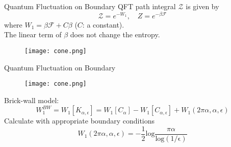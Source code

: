 \documentclass{beamer}
\begin{document}
\begin{frame}{Quantum Fluctuation on Boundary}
    QFT path integral $\mathcal{Z}$ is given by 
    \begin{equation*}
        \mathcal{Z}=e^{-W_1},\quad Z=e^{-\beta\mathcal{F}}
    \end{equation*}
    where $W_1=\beta\mathcal{F}+C\beta$ ($C$: a constant).\\
    The linear term of $\beta$ does not change the entropy.
    \begin{figure}
        \centering
        \texttt{[image: cone.png]}
        \label{cone}
    \end{figure}
\end{frame}
\begin{frame}{Quantum Fluctuation on Boundary}
\begin{figure}
    \centering
    \texttt{[image: cone.png]}
    \label{c}
\end{figure}
    Brick-wall model:
    \begin{equation*}
        W_1^{BW}=W_1[K_{\alpha,\epsilon}]=W_1[C_\alpha]-W_1[C_{\alpha,\epsilon}]+W_1(2\pi\alpha,\alpha,\epsilon)
    \end{equation*}
    Calculate with appropriate boundary conditions
    \begin{equation*}
        W_1(2\pi\alpha,\alpha,\epsilon)=-\frac{1}{2}\mathrm{log}\frac{\pi\alpha}{\mathrm{log(1/\epsilon)}}
    \end{equation*}
\end{frame}
\end{document}
